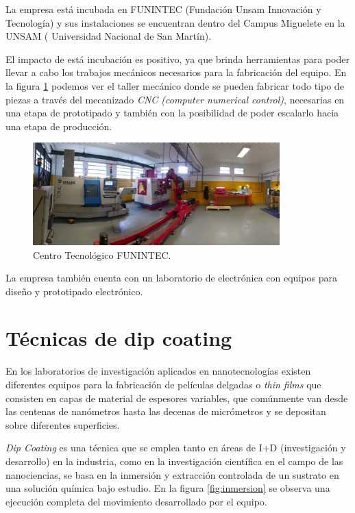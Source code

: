 La empresa está incubada en FUNINTEC (Fundación Unsam Innovación y Tecnología) y sus instalaciones se encuentran dentro del Campus Miguelete en la UNSAM ( Universidad Nacional de San Martín). 

El impacto de está incubación es positivo, ya que brinda herramientas para poder llevar a cabo los trabajos mecánicos necesarios para la fabricación del equipo. En la figura \ref{fig:taller} podemos ver el taller mecánico donde se pueden fabricar todo tipo de piezas a través del mecanizado \textit{CNC (computer numerical control)}, necesarias en una etapa de prototipado y también con la posibilidad de poder escalarlo hacia una etapa de producción. 

\clearpage
\begin{figure}[htpb]
\centering 
\includegraphics[width=0.85\textwidth]{./Figures/taller_v3.pdf}
\caption{Centro Tecnológico FUNINTEC.}
\label{fig:taller}
\end{figure}

La empresa también cuenta con un laboratorio de electrónica con equipos para diseño y prototipado electrónico.

\section{Técnicas de dip coating}

En los laboratorios de investigación aplicados en nanotecnologías existen diferentes equipos para la fabricación de películas delgadas o \textit{thin films} que consisten en capas de material de espesores variables, que comúnmente van desde las centenas de nanómetros hasta las decenas de micrómetros y se depositan sobre diferentes superficies.


\textit{Dip Coating} es una técnica que se emplea tanto en áreas de I+D (investigación y desarrollo) en la industria, como en la investigación científica en el campo de las nanociencias, se basa en la inmersión y extracción  controlada de un sustrato en una solución química bajo estudio. En la figura \ref{fig:inmersion} se observa una ejecución completa del movimiento desarrollado por el equipo.


